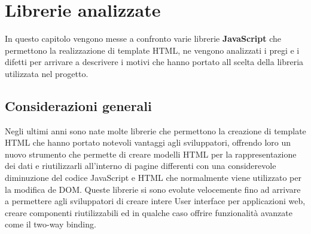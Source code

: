 
\chapter{Librerie analizzate}
\label{cap:librerie-analizzate}
In questo capitolo vengono messe a confronto varie librerie \textbf{JavaScript} che permettono la realizzazione di template HTML, ne vengono analizzati i pregi e i difetti per arrivare a descrivere i motivi che hanno portato all scelta della libreria utilizzata nel progetto.

\section{Considerazioni generali}
Negli ultimi anni sono nate molte librerie che permettono la creazione di template HTML che hanno portato notevoli vantaggi agli sviluppatori, offrendo loro un nuovo strumento che permette di creare modelli HTML per la rappresentazione dei dati e riutilizzarli all'interno di pagine differenti con una considerevole diminuzione del codice JavaScript e HTML che normalmente viene utilizzato per la modifica de DOM.
Queste librerie si sono evolute velocemente fino ad arrivare a permettere agli sviluppatori di creare intere User interface per applicazioni web, creare componenti riutilizzabili ed in qualche caso offrire funzionalità avanzate come il two-way binding.

